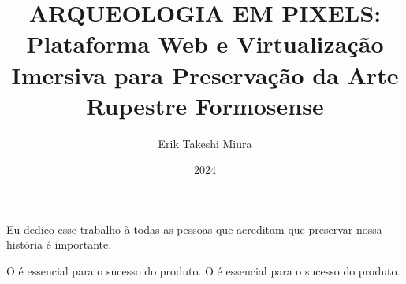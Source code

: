 \documentclass[pt,twoside,onehalfspacing,bsc]{ifgtcc}
\title{
ARQUEOLOGIA EM PIXELS:
Plataforma Web e Virtualização Imersiva para 
Preservação da Arte Rupestre Formosense 
}
\date{2024}
\author{Erik Takeshi Miura}
\begin{document}
\frontmatter
\frontpage
\presentationpage

\begin{fichacatalografica}
\FakeFichaCatalografica %
%
\end{fichacatalografica}

\begin{dedicatory}
Eu dedico esse trabalho à todas as pessoas que acreditam que preservar nossa história é importante.
\end{dedicatory}

\acknowledgements
% 



\resumo


\abstract


\tableofcontents

\listoffigures
\listoftables
\printglossary[type=\acronymtype, title={Acrônimos}] %
\printglossary %
\mainmatter
O  é essencial para o sucesso do produto.
O  é essencial para o sucesso do produto.







\begin{references}

\end{references}

\theappendix
\end{document}
